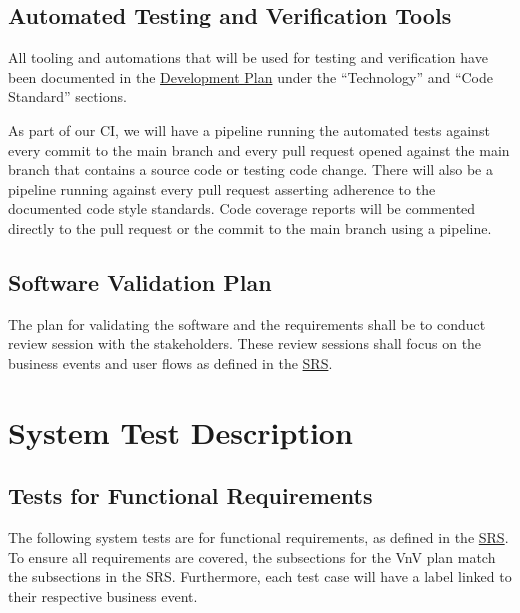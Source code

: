 \documentclass[12pt, titlepage]{article}
\begin{document}
\subsection{Automated Testing and Verification Tools} \label{Automated Testing and Verification Tools}

All tooling and automations that will be used for testing and verification have been documented in
the
\href{https://github.com/arkinmodi/project-sayyara/blob/main/docs/DevelopmentPlan/DevelopmentPlan.pdf}{Development
	Plan} under the ``Technology'' and ``Code Standard'' sections.

As part of our CI, we will have a pipeline running the automated tests against every commit to the
main branch and every pull request opened against the main branch that contains a source code or
testing code change. There will also be a pipeline running against every pull request asserting
adherence to the documented code style standards. Code coverage reports will be commented directly
to the pull request or the commit to the main branch using a pipeline.

\subsection{Software Validation Plan}

The plan for validating the software and the requirements shall be to conduct review session with
the stakeholders. These review sessions shall focus on the business events and user flows as
defined in the \href{https://github.com/arkinmodi/project-sayyara/blob/main/docs/SRS/SRS.pdf}{SRS}.

\section{System Test Description} \label{System Test Description}

\subsection{Tests for Functional Requirements} \label{Tests for Functional Requirements}

The following system tests are for functional requirements, as defined in the
\href{https://github.com/arkinmodi/project-sayyara/blob/main/docs/SRS/SRS.pdf}{SRS}. To ensure all
requirements are covered, the subsections for the VnV plan match the subsections in the SRS.
Furthermore, each test case will have a label linked to their respective business event.
\end{document}
